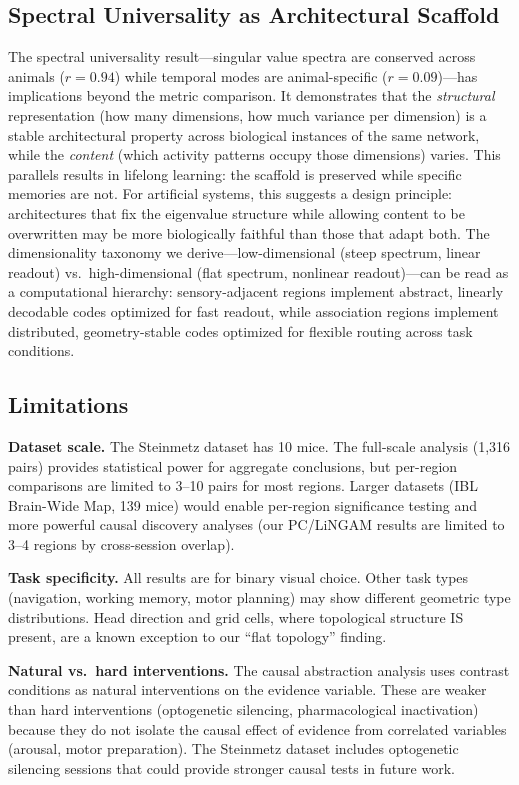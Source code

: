 \documentclass{article}
\begin{document}
\subsection{Spectral Universality as Architectural Scaffold}

The spectral universality result---singular value spectra are conserved across animals ($r = 0.94$) while temporal modes are animal-specific ($r = 0.09$)---has implications beyond the metric comparison. It demonstrates that the \emph{structural} representation (how many dimensions, how much variance per dimension) is a stable architectural property across biological instances of the same network, while the \emph{content} (which activity patterns occupy those dimensions) varies. This parallels results in lifelong learning: the scaffold is preserved while specific memories are not. For artificial systems, this suggests a design principle: architectures that fix the eigenvalue structure while allowing content to be overwritten may be more biologically faithful than those that adapt both. The dimensionality taxonomy we derive---low-dimensional (steep spectrum, linear readout) vs.\ high-dimensional (flat spectrum, nonlinear readout)---can be read as a computational hierarchy: sensory-adjacent regions implement abstract, linearly decodable codes optimized for fast readout, while association regions implement distributed, geometry-stable codes optimized for flexible routing across task conditions.

\subsection{Limitations}

\textbf{Dataset scale.} The Steinmetz dataset has 10 mice. The full-scale analysis (1,316 pairs) provides statistical power for aggregate conclusions, but per-region comparisons are limited to 3--10 pairs for most regions. Larger datasets (IBL Brain-Wide Map, 139 mice) would enable per-region significance testing and more powerful causal discovery analyses (our PC/LiNGAM results are limited to 3--4 regions by cross-session overlap).

\textbf{Task specificity.} All results are for binary visual choice. Other task types (navigation, working memory, motor planning) may show different geometric type distributions. Head direction and grid cells, where topological structure IS present, are a known exception to our ``flat topology'' finding.

\textbf{Natural vs.\ hard interventions.} The causal abstraction analysis uses contrast conditions as natural interventions on the evidence variable. These are weaker than hard interventions (optogenetic silencing, pharmacological inactivation) because they do not isolate the causal effect of evidence from correlated variables (arousal, motor preparation). The Steinmetz dataset includes optogenetic silencing sessions that could provide stronger causal tests in future work.
\end{document}

